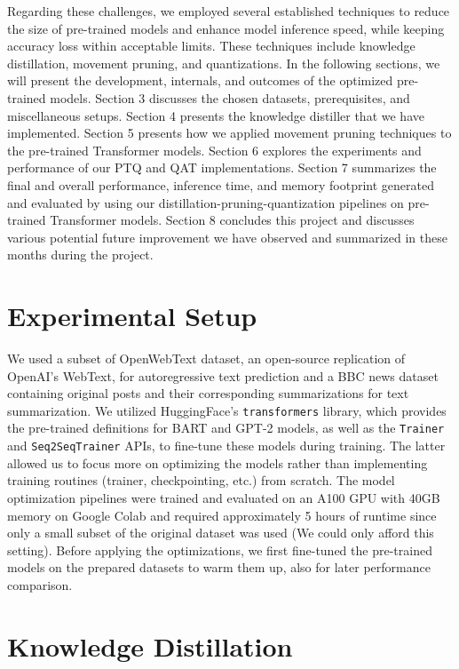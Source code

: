 \documentclass{article}
\begin{document}
    \hspace*{1em} Regarding these challenges, we employed several established techniques to reduce the size of pre-trained models and enhance model inference speed, while keeping accuracy loss within acceptable limits. These techniques include knowledge distillation, movement pruning, and quantizations. In the following sections, we will present the development, internals, and outcomes of the optimized pre-trained models. Section 3 discusses the chosen datasets, prerequisites, and miscellaneous setups. Section 4 presents the knowledge distiller that we have implemented. Section 5 presents how we applied movement pruning techniques to the pre-trained Transformer models. Section 6 explores the experiments and performance of our PTQ and QAT implementations. Section 7 summarizes the final and overall performance, inference time, and memory footprint generated and evaluated by using our distillation-pruning-quantization pipelines on pre-trained Transformer models. Section 8 concludes this project and discusses various potential future improvement we have observed and summarized in these months during the project.

    \section{Experimental Setup}
    \hspace*{1em} We used a subset of OpenWebText dataset\cite{OpenWebText2019}, an open-source replication of OpenAI's WebText, for autoregressive text prediction and a BBC news dataset containing original posts and their corresponding summarizations for text summarization. We utilized HuggingFace's \texttt{transformers}\cite{wolf-etal-2020-transformers} library, which provides the pre-trained definitions for BART and GPT-2 models, as well as the \texttt{Trainer} and \texttt{Seq2SeqTrainer} APIs, to fine-tune these models during training. The latter allowed us to focus more on optimizing the models rather than implementing training routines (trainer, checkpointing, etc.) from scratch. The model optimization pipelines were trained and evaluated on an A100 GPU with 40GB memory on Google Colab and required approximately 5 hours of runtime since only a small subset of the original dataset was used (We could only afford this setting). Before applying the optimizations, we first fine-tuned the pre-trained models on the prepared datasets to warm them up, also for later performance comparison.

    \section{Knowledge Distillation}
\end{document}
